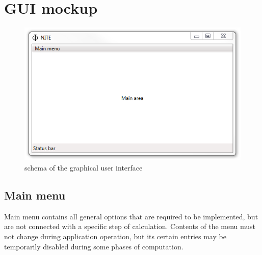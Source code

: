 \documentclass{article}
\begin{document}
% 
% 
% 
% 
% 
% 
% 
% 
% 

\newpage

\section{GUI mockup}

\begin{figure}[ht!]
  \centering
  \includegraphics[width=.5\textwidth]{../../graphics/PhiniteGuiMockup.png}
  \caption{schema of the graphical user interface}
\end{figure}

\subsection{Main menu}
Main menu contains all general options that are required to be implemented, but are not connected
with a specific step of calculation. Contents of the menu must not change during application
operation, but its certain entries may be temporarily disabled during some phases of computation.
\end{document}
